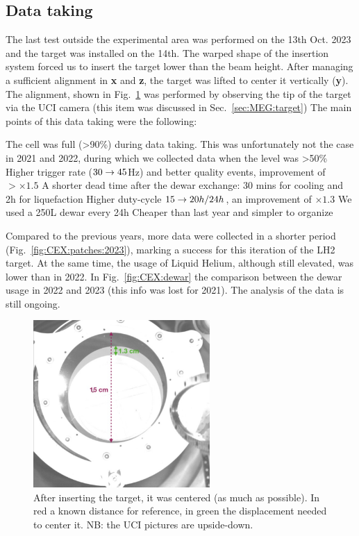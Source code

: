 \begin{refsection}
    \subsection{Data taking}
        The last test outside the experimental area was performed on the 13th Oct. 2023 and the target was installed on the 14th.
        The warped shape of the insertion system forced us to insert the target lower than the beam height. 
        After managing a sufficient alignment in \textbf{x} and \textbf{z}, the target was lifted to center it vertically (\textbf{y}). The alignment, shown in Fig.~\ref{fig:CEX:2023:allignement} was performed by observing the tip of the target via the UCI camera (this item was discussed in Sec.~\ref{sec:MEG:target})
        The main points of this data taking were the following:
        \begin{outline}
            \1 The cell was full (>90\%) during data taking. This was unfortunately not the case in 2021 and 2022, during which we collected data when the level was >50\%
            \2[->] Higher trigger rate ($30\rightarrow45$Hz) and better quality events, improvement of $>\times1.5$
            \1 A shorter dead time after the dewar exchange: 30 mins for cooling and 2h for liquefaction
            \2[->] Higher duty-cycle $15\rightarrow20h/24h$, an improvement of $\times1.3$
            \1 We used a 250L dewar every 24h
            \2[->] Cheaper than last year and simpler to organize
        \end{outline}
        Compared to the previous years, more data were collected in a shorter period (Fig.~\ref{fig:CEX:patches:2023}), marking a success for this iteration of the LH2 target. 
        At the same time, the usage of Liquid Helium, although still elevated, was lower than in 2022. In Fig.~\ref{fig:CEX:dewar} the comparison between the dewar usage in 2022 and 2023 (this info was lost for 2021).
        The analysis of the data is still ongoing.

        \begin{figure}
            \centering
            \includegraphics[width=0.6\textwidth]{Figures/LH2/2023/LH2_UCI_2023.png}
            \caption[CW 2023: target alignment]{After inserting the target, it was centered (as much as possible). In red a known distance for reference, in green the displacement needed to center it. NB: the UCI pictures are upside-down.}
            \label{fig:CEX:2023:allignement}
        \end{figure}


\end{refsection}
